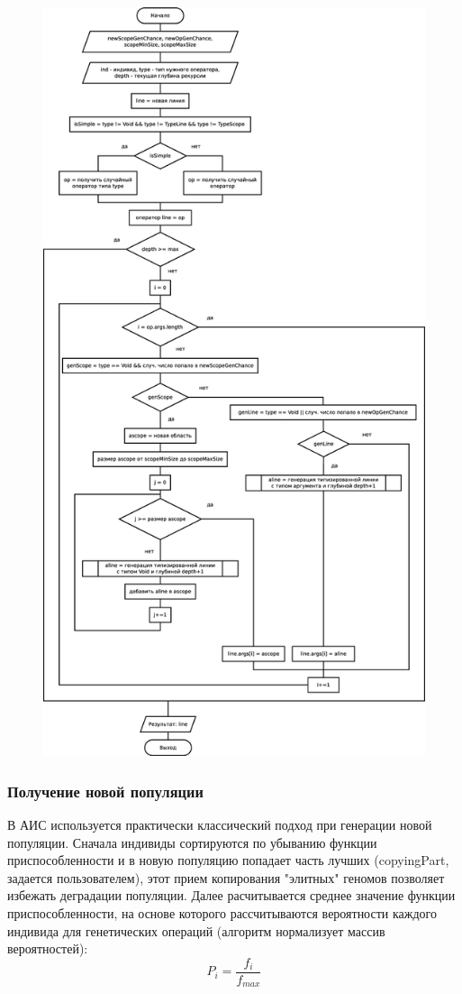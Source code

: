 \documentclass[russian,utf8,emptystyle]{eskdtext}
\begin{document}
\begin{spacing}{1.5}
\clearpage
\begin{figure}[h!]
\centering
\includegraphics[height=1.0\textheight]{generate_typed_line_alg.eps}
\end{figure}
\clearpage

\newpage
\subsubsection{Получение новой популяции}
В АИС используется практически классический подход при генерации новой популяции. Сначала индивиды сортируются по убыванию функции приспособленности и в новую популяцию попадает часть лучших (copyingPart, задается пользователем), этот прием копирования "элитных" геномов позволяет избежать деградации популяции. Далее расчитывается среднее значение функции приспособленности, на основе которого рассчитываются вероятности каждого индивида для генетических операций (алгоритм нормализует массив вероятностей):
$$
P_i = \frac{f_i}{f_{max}}
$$


\end{spacing}
\end{document}
